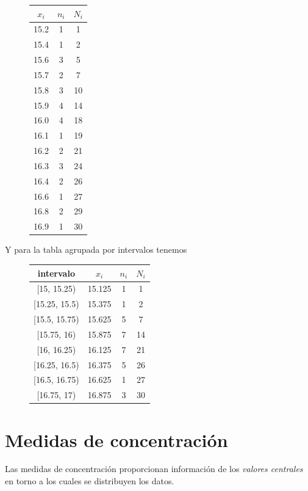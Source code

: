 \documentclass[]{article}
\theoremstyle{plain}
\theoremstyle{definition}
\theoremstyle{definition} %
\begin{document}
\begin{figure}
  \centering
\begin{tabular}{ccc}
\(x_i\) & \(n_i\) & \(N_i\)\\
\hline
15.2 & 1 & 1 \\
15.4 & 1 & 2 \\
15.6 & 3 & 5 \\
15.7 & 2 & 7 \\
15.8 & 3 & 10\\
15.9 & 4 & 14\\
16.0 & 4 & 18\\
16.1 & 1 & 19\\
16.2 & 2 & 21\\
16.3 & 3 & 24\\
16.4 & 2 & 26\\
16.6 & 1 & 27\\
16.8 & 2 & 29\\
16.9 & 1 & 30
\end{tabular}
\end{figure}

Y para la tabla agrupada por intervalos tenemos

\begin{figure}
  \centering
\begin{tabular}{cccc}
intervalo & \(x_i\) & \(n_i\) & \(N_i\)\\
\hline
{[}15, 15.25)   & 15.125 & 1 & 1 \\
{[}15.25, 15.5) & 15.375 & 1 & 2 \\
{[}15.5, 15.75) & 15.625 & 5 & 7 \\
{[}15.75, 16)   & 15.875 & 7 & 14\\
{[}16, 16.25)   & 16.125 & 7 & 21\\
{[}16.25, 16.5) & 16.375 & 5 & 26\\
{[}16.5, 16.75) & 16.625 & 1 & 27\\
{[}16.75, 17)   & 16.875 & 3 & 30
\end{tabular}
\end{figure}

\hypertarget{medidas-de-concentraciuxf3n}{%
\section{Medidas de concentración}\label{medidas-de-concentraciuxf3n}}

Las medidas de concentración proporcionan información de los
\emph{valores centrales} en torno a los cuales se distribuyen los datos.
\end{document}

